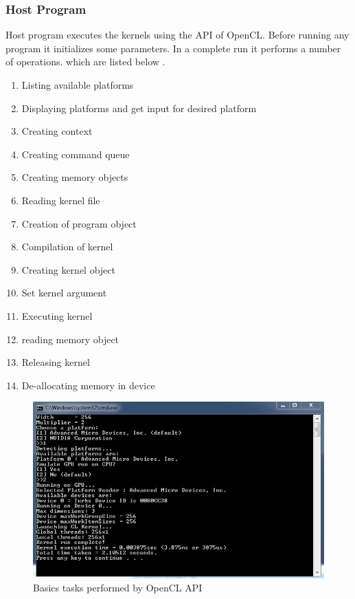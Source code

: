 \subsubsection{Host Program}
\label{HostProgram}
Host program executes the kernels using the API of OpenCL. Before running any program it initializes some parameters. In a complete run it performs a number of operations. which are listed below \cite{openclpro}.
\begin{enumerate}
\item Listing available platforms
\item Displaying platforms and get input for desired platform
\item Creating context
\item Creating command queue
\item Creating memory objects
\item Reading kernel file
\item Creation of program object
\item Compilation of kernel
\item Creating kernel object
\item Set kernel argument
\item Executing kernel
\item reading memory object
\item Releasing kernel
\item De-allocating memory in device
\end{enumerate}
\begin{figure}[H]
	\centering
		\includegraphics[width=6in]{Figures/opencl.jpg}
	\caption[OpenCL basic run]{ Basics tasks performed by OpenCL API}
	\label{opencl}
\end{figure}

